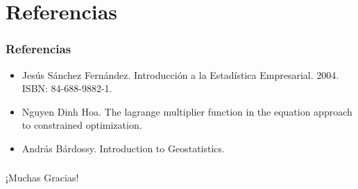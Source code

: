 \documentclass{beamer}
\begin{document}
\section{Referencias}
\begin{frame}
\frametitle{Referencias}
\begin{itemize}
\item Jesús Sánchez Fernández. Introducción a la Estadística Empresarial. 2004. ISBN: 84-688-9882-1.
\item Nguyen Dinh Hoa. The lagrange multiplier function in the equation approach to constrained optimization.
\item András Bárdossy. Introduction to Geostatistics.
\end{itemize}
\end{frame}

\begin{frame}
\frametitle{}
\begin{center}
\huge{¡Muchas Gracias!}
\end{center}
\end{frame}
\end{document}
